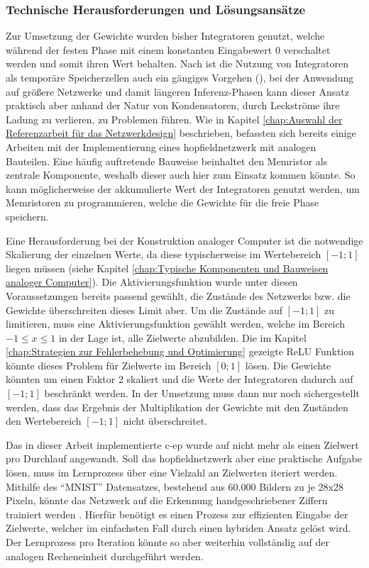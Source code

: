 \subsubsection{Technische Herausforderungen und Lösungsansätze}

Zur Umsetzung der Gewichte wurden bisher Integratoren genutzt, welche während der festen Phase mit einem konstanten Eingabewert \(0\) verschaltet werden und somit ihren Wert behalten. Nach \citeauthor{Ulmann2022} ist die Nutzung von Integratoren als temporäre Speicherzellen auch ein gängiges Vorgehen (\cite[vgl. S. 92]{Ulmann2022}), bei der Anwendung auf größere Netzwerke und damit längeren Inferenz-Phasen kann dieser Ansatz praktisch aber anhand der Natur von Kondensatoren, durch Leckströme ihre Ladung zu verlieren, zu Problemen führen. Wie in Kapitel \ref{chap:Auswahl der Referenzarbeit für das Netzwerkdesign} beschrieben, befassten sich bereits einige Arbeiten mit der Implementierung eines \gls{hopfieldnetzwerk} mit analogen Bauteilen. Eine häufig auftretende Bauweise beinhaltet den Memristor als zentrale Komponente, weshalb dieser auch hier zum Einsatz kommen könnte. So kann möglicherweise der akkumulierte Wert der Integratoren genutzt werden, um Memristoren zu programmieren, welche die Gewichte für die freie Phase speichern.

Eine Herausforderung bei der Konstruktion analoger Computer ist die notwendige Skalierung der einzelnen Werte, da diese typischerweise im Wertebereich \([-1;1]\) liegen müssen (siehe Kapitel \ref{chap:Typische Komponenten und Bauweisen analoger Computer}). Die Aktivierungsfunktion wurde unter diesen Voraussetzungen bereits passend gewählt, die Zustände des Netzwerks bzw. die Gewichte überschreiten dieses Limit aber. Um die Zustände auf \([-1;1]\) zu limitieren, muss eine Aktivierungsfunktion gewählt werden, welche im Bereich \(-1\leq x\leq 1\) in der Lage ist, alle Zielwerte abzubilden. Die im Kapitel \ref{chap:Strategien zur Fehlerbehebung und Optimierung} gezeigte ReLU Funktion könnte dieses Problem für Zielwerte im Bereich \([0;1]\) lösen. Die Gewichte könnten \zb um einen Faktor \(2\) skaliert und die Werte der Integratoren dadurch auf \([-1;1]\) beschränkt werden. In der Umsetzung muss dann nur noch sichergestellt werden, dass das Ergebnis der Multiplikation der Gewichte mit den Zuständen den Wertebereich \([-1;1]\) nicht überschreitet.

Das in dieser Arbeit implementierte \gls{c-ep} wurde auf nicht mehr als einen Zielwert pro Durchlauf angewandt. Soll das \gls{hopfieldnetzwerk} aber eine praktische Aufgabe lösen, muss im Lernprozess über eine Vielzahl an Zielwerten iteriert werden. Mithilfe des "`MNIST"' Datensatzes, bestehend aus 60.000 Bildern zu je 28x28 Pixeln, könnte das Netzwerk \zb auf die Erkennung handgeschriebener Ziffern trainiert werden \cite{Deng2012}. Hierfür benötigt es einen Prozess zur effizienten Eingabe der Zielwerte, welcher im einfachsten Fall durch einen hybriden Ansatz gelöst wird. Der Lernprozess pro Iteration könnte so aber weiterhin vollständig auf der analogen Recheneinheit durchgeführt werden.
